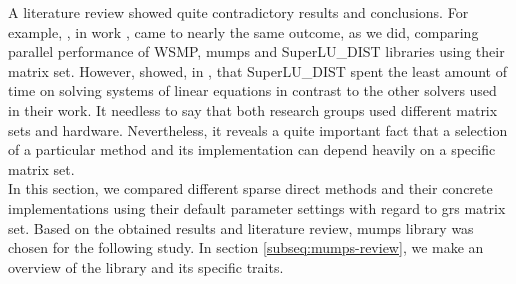 A literature review showed quite contradictory results and conclusions. For example, \citeauthor{wsmp}, in work \cite{wsmp}, came to nearly the same outcome, as we did, comparing parallel performance of WSMP, \acrshort{mumps} and SuperLU\_DIST libraries using their matrix set. However, \citeauthor{mm-comparison-of-packages} showed, in \cite{mm-comparison-of-packages}, that SuperLU\_DIST spent the least amount of time on solving  systems of linear equations in contrast to the other solvers used in their work. It needless to say that both research groups used different matrix sets and hardware. Nevertheless, it reveals a quite important fact that a selection of a particular method and its implementation can depend heavily on a specific matrix set.\\


In this section, we compared different sparse direct methods and their concrete implementations using their default parameter settings with regard to \acrshort{grs} matrix set. Based on the obtained results and literature review, \acrshort{mumps} library was chosen for the following study. In section \ref{subseq:mumps-review}, we make an overview of the library and its specific traits. \\
